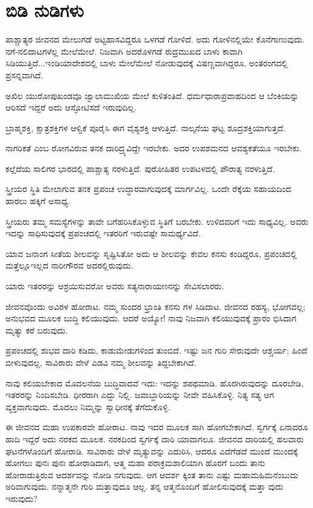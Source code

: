 \section{ಬಿಡಿ ನುಡಿಗಳು}

ಪಾಶ್ಚಾತ್ಯರ ಜೀವನದ ಮೇಲುಗಡೆ ಅಟ್ಟಹಾಸವಿದ್ದರೂ ಒಳಗಡೆ ಗೋಳಿದೆ. ಅದು ಗೋಳಿನಲ್ಲಿಯೇ ಕೊನೆಗಾಣುವುದು. ನಗೆ-ನಲಿದಾಟಗಳೆಲ್ಲ ಮೇಲೆಮೇಲೆ. ನಿಜವಾಗಿ ಅದರೊಳಗಡೆ ರುದ್ರಮುಖದ ಬಾಳು ಕಾವಾಗಿ ಸಿಡಿಯುತ್ತಿದೆ...ಇಂಡಿಯಾದೇಶದಲ್ಲಿ ಬಾಳು ಮೇಲೆಮೇಲೆ ನೋಡುವುದಕ್ಕೆ ವಿಷಣ್ಣವಾಗಿದ್ದರೂ, ಅಂತರಂಗದಲ್ಲಿ ಪ್ರಸನ್ನವಾಗಿದೆ.

ಅಖಿಲ ಯುರೋಪುಖಂಡವೂ ಜ್ವಾಲಾಮುಖಿಯ ಮೇಲೆ ಕುಳಿತಂತಿದೆ. ಧರ್ಮಧಾರಾಪ್ರವಾಹದಿಂದ ಆ ಬೆಂಕಿಯನ್ನು ಆರಿಸದೆ ಇದ್ದರೆ ಅದು ಆಸ್ಫೋಟಿಸದೆ ಇರುವುದಿಲ್ಲ.

ಬ್ರಾಹ್ಮಶಕ್ತಿ, ಕ್ಷಾತ್ರಶಕ್ತಿಗಳ ಆಳ್ವಿಕೆ ಪೂರೈಸಿ ಈಗ ವೈಶ್ಯಶಕ್ತಿ ಆಳುತ್ತಿದೆ. ನಾಲ್ಕನೆಯ ಘಟ್ಟ ಶೂದ್ರಶಕ್ತಿಯಾಗುತ್ತದೆ. 

ನಾಗರಿಕತೆ ಎಂಬ ರೋಗವಿರುವ ತನಕ ದಾರಿದ್ರ್ಯವಿದ್ದೇ ಇರಬೇಕು. ಅದರ ಉಪಶಮನದ ಆವಶ್ಯಕತೆಯೂ ಇರಬೇಕು.

ಕಲ್ಲೆದೆಯ ಸಾಲಿಗರ ಭಾರದಲ್ಲಿ ಪಾಶ್ಚಾತ್ಯ ನರಳುತ್ತಿದೆ. ಪುರೋಹಿತರ ಉಪಟಳದಲ್ಲಿ ಪೌರಾತ್ಯ ನರಳುತ್ತಿದೆ.

ಸ್ತ್ರೀಯರ ಸ್ಥಿತಿ ಮೇಲಾಗುವ ತನಕ ಪ್ರಪಂಚ ಉದ್ಧಾರವಾಗುವುದಕ್ಕೆ ಮಾರ್ಗವಿಲ್ಲ. ಒಂದೇ ರೆಕ್ಕೆಯ ಸಹಾಯದಿಂದ ಹಾರಲು ಹಕ್ಕಿಗೆ ಅಸಾಧ್ಯ.

ಸ್ತ್ರೀಯರು ತಮ್ಮ ಸಮಸ್ಯೆಗಳನ್ನು ತಾವೇ ಬಗೆಹರಿಸಿಕೊಳ್ಳುವ ಸ್ಥಿತಿಗೆ ಬರಬೇಕು. ಉಳಿದವರಿಗೆ ಇದು ಸಾಧ್ಯವಿಲ್ಲ. ಅವರು ಇದನ್ನು ಸಾಧಿಸುವುದಕ್ಕೆ ಪ್ರಪಂಚದಲ್ಲಿ ಇತರರಿಗೆ ಇರುವಷ್ಟೇ ಸಾಮರ್ಥ್ಯವಿದೆ.

ಯಾವ ಜನಾಂಗ ಸೀತೆಯ ಶೀಲವನ್ನು ಸೃಷ್ಟಿಸಿತೋ ಅದು ಆ ಶೀಲವನ್ನು ಕೇವಲ ಕನಸು ಕಂಡಿದ್ದರೂ, ಪ್ರಪಂಚದಲ್ಲಿ ಮತ್ತೆಲ್ಲೂಇಲ್ಲದ ನಾರೀಗೌರವ ಅದರಲ್ಲಿರುವುದು.

ಯಾರು ಇತರರನ್ನು ಆಶ್ರಯಿಸುವರೋ ಅವರು ಸತ್ಯನಾರಾಯಣನನ್ನು ಸೇವಿಸಲಾರರು.

ಜೀವನವೊಂದು ಅವಿರಳ ಹೋರಾಟ. ನಮ್ಮ ಸುಂದರ ಭ್ರಾಂತಿ ಕನಸು ಗಳ ಸಿಡಿದಾಟ. ಜೀವನದ ರಹಸ್ಯ, ಭೋಗವಲ್ಲ; ಅನುಭವದ ಮೂಲಕ ಬುದ್ಧಿ ಕಲಿಯುವುದು. ಆದರೆ ಅಯ್ಯೋ! ನಾವು ನಿಜವಾಗಿ ಕಲಿಯುವುದಕ್ಕೆ ಪ್ರಾರಂ ಭಿಸಿದಾಗ ಮೃತ್ಯು ಕರೆ ಬರುವುದು.

ಪ್ರಪಂಚದಲ್ಲಿ ಶುಭದ ದಾರಿ ಕಡಿದು, ಕಾಡುಮೇಡುಗಳಿಂದ ತುಂಬಿದೆ. ಇಷ್ಟು ಜನ ಗುರಿ ಸೇರುವುದೇ ಆಶ್ಚರ್ಯ; ಹಿಂದೆ ಬೀಳುವುದಲ್ಲ, ಸಾವಿರಾರು ವೇಳೆ ಎಡವಿ ನಮ್ಮ ಶೀಲವನ್ನು ತಿದ್ದಬೇಕಾಗಿದೆ.

ನಾವು ಕಲಿಯಬೇಕಾದ ಮೊದಲನೆಯ ಬುದ್ಧಿವಾದವೆ ಇದು: ಇದನ್ನು ಶಪಥಮಾಡಿ. ಹೊರಗಿರುವುದನ್ನು ದೂರಬೇಡಿ, ಇತರರನ್ನು ನಿಂದಿಸಬೇಡಿ. ಧೀರರಾಗಿ ಎದ್ದು ನಿಲ್ಲಿ. ಜವಾಬ್ದಾರಿಯನ್ನು ನೀವೇ ವಹಿಸಿಕೊಳ್ಳಿ. ನಿತ್ಯ ಸತ್ಯ ಆಗ ವ್ಯಕ್ತವಾಗುವುದು. ಮೊದಲು ನಿಮ್ಮನ್ನು ಸ್ವಾಧೀನಕ್ಕೆ ತೆಗೆದುಕೊಳ್ಳಿ.

ಈ ಜೀವನದ ಮಹಾ ಉಪಕಾರವೇ ಹೋರಾಟ. ನಾವು ಇದರ ಮೂಲಕ ಸಾಗಿ ಹೋಗಬೇಕಾಗಿದೆ. ಸ್ವರ್ಗಕ್ಕೆ ಏನಾದರೂ ಹಾದಿ ಇದ್ದರೆ ಅದು ನರಕದ ಮೂಲಕ. ನರಕದಿಂದ ಸ್ವರ್ಗಕ್ಕೆ ದಾರಿ ಯಾವಾಗಲೂ. ಜೀವನದ ದಾರಿಯಲ್ಲಿ ಹಲವಾರು ಘಟನೆಗಳೊಂದಿಗೆ ಹೋರಾಡಿ. ಸಾವಿರಾರು ವೇಳೆ ಮೃತ್ಯುವನ್ನು ಎದುರಿಸಿ, ಆದರೂ ಎದೆಗೆಡದೆ ಮುಂದೆ ಮುಂದಕ್ಕೆ ಹೋಗಲು ಪುನಃ ಪುನಃ ಹೋರಾಡಿದಾಗ, ಆತ್ಮ ಮಹಾ ಪರಾಕ್ರಮಶಾಲಿಯಾಗಿ ಹೊರಗೆ ಬಂದು ತಾನು ಹೋರಾಡುತ್ತಿರುವ ಆದರ್ಶವನ್ನು ನೋಡಿ ನಗುವುದು. ಆಗ ಆದರ್ಶ ಕ್ಕಿಂತ ತಾನು ಎಷ್ಟು ಮಹಾಮಹಿಮನೆಂಬುದು ಅರಿವಾಗುವುದು. ನನ್ನಾತ್ಮನೇ ಗುರಿ ಮತ್ತಾವುದೂ ಆಲ್ಲ. ತನ್ನ ಆತ್ಮನೊಂದಿಗೆ ಹೋಲಿಸುವುದಕ್ಕೆ ಮತ್ತಾ ವುದು ಇರುವುದು?

